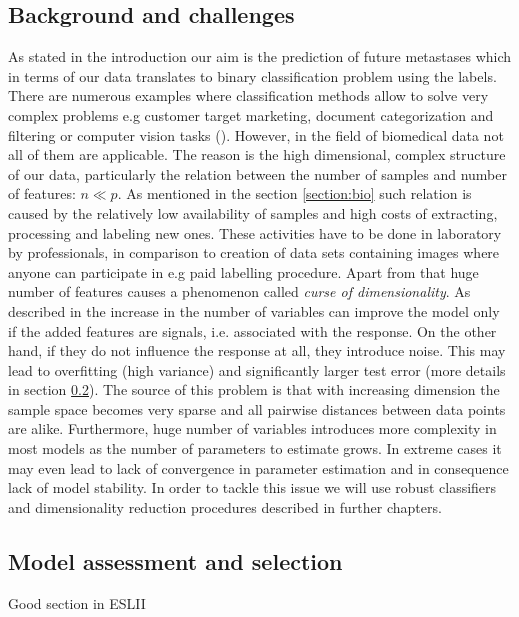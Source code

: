 \documentclass[12pt, wide]{mwart}
\begin{document}
\subsection{Background and challenges} \label{section:challenges}

As stated in the introduction our aim is the prediction of future metastases which in terms of our data translates to binary classification problem using the labels. There are numerous examples where classification methods allow to solve very complex problems e.g customer target marketing, document categorization and filtering or computer vision tasks (\cite{dataClassification}). However, in the field of biomedical data not all of them are applicable. The reason is the high dimensional, complex structure of our data, particularly the relation between the number of samples and number of features: $n \ll p$. As mentioned in the section \ref{section:bio} such relation is caused by the relatively low availability of samples and high costs of extracting, processing and labeling new ones. These activities have to be done in laboratory by professionals, in comparison to creation of data sets containing images where anyone can participate in e.g paid labelling procedure. Apart from that huge number of features causes a phenomenon called \textit{curse of dimensionality}. As described in \cite{ISL} the increase in the number of variables can improve the model only if the added features are signals, i.e. associated with the response. On the other hand, if they do not influence the response at all, they introduce noise. This may lead to overfitting (high variance) and significantly larger test error (more details in section \ref{section:selection}). The source of this problem is that with increasing dimension the sample space becomes very sparse and all pairwise distances between data points are alike. Furthermore, huge number of variables introduces more complexity in most models as the number of parameters to estimate grows. In extreme cases it may even lead to lack of convergence in parameter estimation and in consequence lack of model stability. In order to tackle this issue we will use robust classifiers and dimensionality reduction procedures described in further chapters.

\subsection{Model assessment and selection} \label{section:selection}

Good section in ESLII
\end{document}
